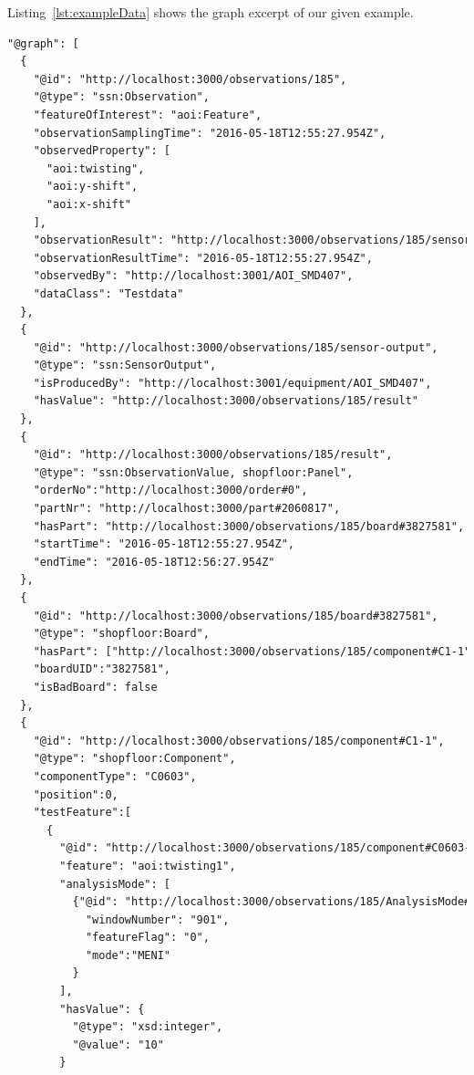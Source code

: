 Listing~\ref{lst:exampleData} shows the graph excerpt of our given example.

\begin{lstlisting}[language={XML},label={lst:exampleData},caption={An excerpt showing the observation of components.}]
"@graph": [
  {
    "@id": "http://localhost:3000/observations/185",
    "@type": "ssn:Observation",
    "featureOfInterest": "aoi:Feature",
    "observationSamplingTime": "2016-05-18T12:55:27.954Z",
    "observedProperty": [
      "aoi:twisting",
      "aoi:y-shift",
      "aoi:x-shift"
    ],
    "observationResult": "http://localhost:3000/observations/185/sensor-output",
    "observationResultTime": "2016-05-18T12:55:27.954Z",
    "observedBy": "http://localhost:3001/AOI_SMD407",
    "dataClass": "Testdata"
  },
  {
    "@id": "http://localhost:3000/observations/185/sensor-output",
    "@type": "ssn:SensorOutput",
    "isProducedBy": "http://localhost:3001/equipment/AOI_SMD407",
    "hasValue": "http://localhost:3000/observations/185/result"
  },
  {
    "@id": "http://localhost:3000/observations/185/result",
    "@type": "ssn:ObservationValue, shopfloor:Panel",
    "orderNo":"http://localhost:3000/order#0",
    "partNr": "http://localhost:3000/part#2060817",
    "hasPart": "http://localhost:3000/observations/185/board#3827581",
    "startTime": "2016-05-18T12:55:27.954Z",
    "endTime": "2016-05-18T12:56:27.954Z"
  },
  {
    "@id": "http://localhost:3000/observations/185/board#3827581",
    "@type": "shopfloor:Board",
    "hasPart": ["http://localhost:3000/observations/185/component#C1-1","http://localhost:3000/observations/185/component#C2-1"],
    "boardUID":"3827581",
    "isBadBoard": false
  },
  {
    "@id": "http://localhost:3000/observations/185/component#C1-1",
    "@type": "shopfloor:Component",
    "componentType": "C0603",
    "position":0,
    "testFeature":[
      {
        "@id": "http://localhost:3000/observations/185/component#C0603-MENI-901-TWISTING",
        "feature": "aoi:twisting1",
        "analysisMode": [
          {"@id": "http://localhost:3000/observations/185/AnalysisMode#C0603-MENI-901-TWISTING",
            "windowNumber": "901",
            "featureFlag": "0",
            "mode":"MENI"
          }
        ],
        "hasValue": {
          "@type": "xsd:integer",
          "@value": "10"
        }


\end{lstlisting}
